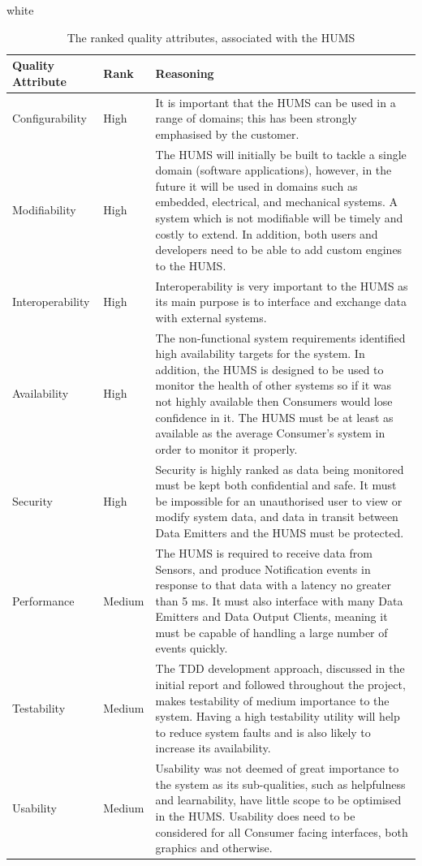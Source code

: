\documentclass[10pt,a4paper]{article}
\newcommand{\tableformat}[4]{
\begin{table}[ht!]
\centering
  \rowcolors{2}{gray!10} {white}
\begin{tabular}{#1}
  \hline
  \rowcolor[gray]{0.9} #2
\end{tabular}
\caption{#3}
\label{#4}
\end{table}}
\begin{document}
\tableformat{p{2.4cm} p{1.2cm} p{11.2cm}}{
\hline
Quality \qquad Attribute & Rank & Reasoning \\
\hline
Configurability & High & It is important that the HUMS can be used in a range of domains; this has been strongly emphasised by the customer. 
\\
Modifiability & High & The HUMS will initially be built to tackle a single domain (software applications), however, in the future it will be used in domains such as embedded, electrical, and mechanical systems. A system which is not modifiable will be timely and costly to extend. In addition, both users and developers need to be able to add custom engines to the HUMS.
\\
Interoperability & High & Interoperability is very important to the HUMS as its main purpose is to interface and exchange data with external systems. 
\\
Availability & High & The non-functional system requirements identified high availability targets for the system. In addition, the HUMS is designed to be used to monitor the health of other systems so if it was not highly available then Consumers would lose confidence in it. The HUMS must be at least as available as the average Consumer's system in order to monitor it properly. 
\\
Security & High & Security is highly ranked as data being monitored must be kept both confidential and safe. It must be impossible for an unauthorised user to view or modify system data, and data in transit between Data Emitters and the HUMS must be protected.
\\
Performance & Medium & The HUMS is required to receive data from Sensors, and produce Notification events in response to that data with a latency no greater than 5 ms. It must also interface with many Data Emitters and Data Output Clients, meaning it must be capable of handling a large number of events quickly.
\\
Testability & Medium & The TDD development approach, discussed in the initial report and followed throughout the project, makes testability of medium importance to the system. Having a high testability utility will help to reduce system faults and is also likely to increase its availability. 
\\
Usability & Medium & Usability was not deemed of great importance to the system as its sub-qualities, such as helpfulness and learnability, have little scope to be optimised in the HUMS. Usability does need to be considered for all Consumer facing interfaces, both graphics and otherwise.
\\
}{The ranked quality attributes, associated with the HUMS}{tab:qualities}
\end{document}
